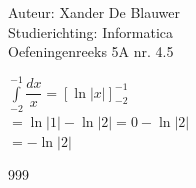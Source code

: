 \documentclass[a4paper]{article}
\begin{document}
\noindent \large Auteur: Xander De Blauwer \\
\noindent \large Studierichting: Informatica\\
\noindent \large Oefeningenreeks 5A nr. 4.5\\

\medskip

\normalsize

$\displaystyle\int\limits_{-2}^{-1} \dfrac{dx}{x} = [\ln|x|]^{-1}_{-2} $ \\

$ = \ln|1| - \ln|2| = 0 - \ln|2| $ \\

$ = -\ln|2| $ \\



\begin{thebibliography}{999}
\end{thebibliography}
\end{document}
